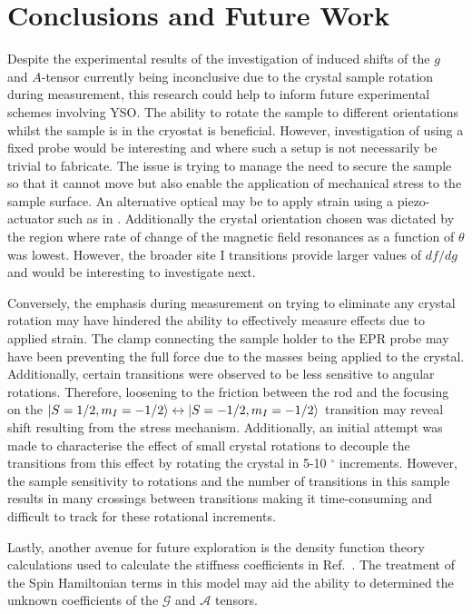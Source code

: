 \section{Conclusions and Future Work}
Despite the experimental results of the investigation of induced shifts of the $g$ and $A$-tensor currently being inconclusive due to the crystal sample rotation during measurement, this research could help to inform future experimental schemes involving YSO. The ability to rotate the sample to different orientations whilst the sample is in the cryostat is beneficial. However, investigation of using a fixed probe would be interesting and where such a setup is not necessarily be trivial to fabricate. The issue is trying to manage the need to secure the sample so that it cannot move but also enable the application of mechanical stress to the sample surface. An alternative optical may be to apply strain using a piezo-actuator such as in \citep{PhysRevLett.115.057601}. Additionally the crystal orientation chosen was dictated by the region where rate of change of the magnetic field resonances as a function of $\theta$ was lowest. However, the broader site I transitions provide larger values of $df/dg$ and would be interesting to investigate next.  

Conversely, the emphasis during measurement on trying to eliminate any crystal rotation may have hindered the ability to effectively measure effects due to applied strain. The clamp connecting the sample holder to the EPR probe may have been preventing the full force due to the masses being applied to the crystal. Additionally, certain transitions were observed to be less sensitive to angular rotations. Therefore, loosening to the friction between the rod and the focusing on the $\lvert S=1/2,m_{I}=-1/2\rangle \leftrightarrow \lvert S=-1/2,m_{I}=-1/2\rangle$ transition may reveal shift resulting from the stress mechanism. Additionally, an initial attempt was made to characterise the effect of small crystal rotations to decouple the transitions from this effect by rotating the crystal in 5-10 $^{\circ}$ increments. However, the sample sensitivity to rotations and the number of transitions in this sample results in many crossings between transitions making it time-consuming and difficult to track for these rotational increments.  

Lastly, another avenue for future exploration is the density function theory calculations used to calculate the stiffness coefficients in Ref.~\citep{Ceramics}. The treatment of the Spin Hamiltonian terms in this model may aid the ability to determined the unknown coefficients of the $\bm{\mathcal{G}}$ and $\bm{\mathcal{A}}$ tensors. 


